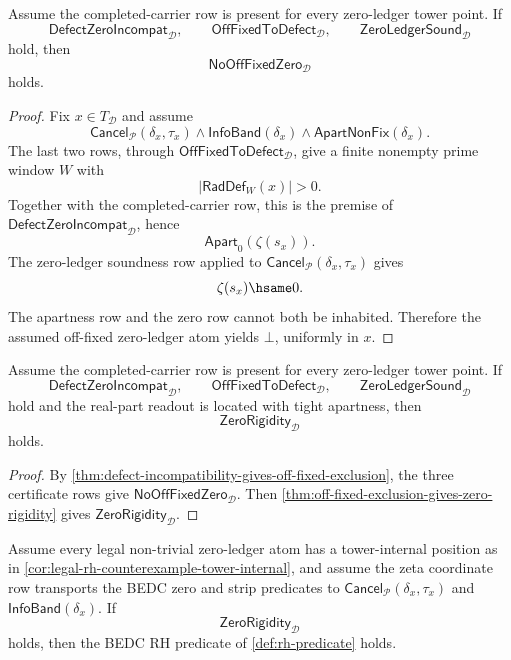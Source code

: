 \begin{theorem}
\label{thm:defect-incompatibility-gives-off-fixed-exclusion}
Assume the completed-carrier row is present for every zero-ledger tower
point.  If
$$
\mathsf{DefectZeroIncompat}_{\mathcal D},
\qquad
\mathsf{OffFixedToDefect}_{\mathcal D},
\qquad
\mathsf{ZeroLedgerSound}_{\mathcal D}
$$
hold, then
$$
\mathsf{NoOffFixedZero}_{\mathcal D}
$$
holds.
\end{theorem}

\begin{proof}
Fix $x\in T_{\mathcal D}$ and assume
$$
\mathsf{Cancel}_{\mathcal P}(\delta_x,\tau_x)
\wedge
\mathsf{InfoBand}(\delta_x)
\wedge
\mathsf{ApartNonFix}(\delta_x).
$$
The last two rows, through
$\mathsf{OffFixedToDefect}_{\mathcal D}$, give a finite nonempty prime
window $W$ with
$$
|\mathsf{RadDef}_{W}(x)|>0.
$$
Together with the completed-carrier row, this is the premise of
$\mathsf{DefectZeroIncompat}_{\mathcal D}$, hence
$$
\mathsf{Apart}_{0}(\zeta(s_x)).
$$
The zero-ledger soundness row applied to
$\mathsf{Cancel}_{\mathcal P}(\delta_x,\tau_x)$ gives
$$
\zeta(s_x)\hsame 0.
$$
The apartness row and the zero row cannot both be inhabited.  Therefore
the assumed off-fixed zero-ledger atom yields $\bot$, uniformly in $x$.
\end{proof}

\begin{corollary}
\label{cor:defect-route-gives-zero-rigidity}
Assume the completed-carrier row is present for every zero-ledger tower
point.  If
$$
\mathsf{DefectZeroIncompat}_{\mathcal D},
\qquad
\mathsf{OffFixedToDefect}_{\mathcal D},
\qquad
\mathsf{ZeroLedgerSound}_{\mathcal D}
$$
hold and the real-part readout is located with tight apartness, then
$$
\mathsf{ZeroRigidity}_{\mathcal D}
$$
holds.
\end{corollary}

\begin{proof}
By \autoref{thm:defect-incompatibility-gives-off-fixed-exclusion}, the
three certificate rows give
$\mathsf{NoOffFixedZero}_{\mathcal D}$.  Then
\autoref{thm:off-fixed-exclusion-gives-zero-rigidity} gives
$\mathsf{ZeroRigidity}_{\mathcal D}$.
\end{proof}

\begin{theorem}
\label{thm:closure-zero-rigidity-give-bedc-rh-target}
Assume every legal non-trivial zero-ledger atom has a tower-internal
position as in \autoref{cor:legal-rh-counterexample-tower-internal}, and
assume the zeta coordinate row transports the BEDC zero and strip
predicates to
$\mathsf{Cancel}_{\mathcal P}(\delta_x,\tau_x)$ and
$\mathsf{InfoBand}(\delta_x)$.  If
$$
\mathsf{ZeroRigidity}_{\mathcal D}
$$
holds, then the BEDC RH predicate of \autoref{def:rh-predicate} holds.
\end{theorem}

